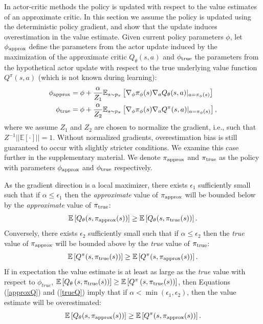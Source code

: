 \documentclass{article}
\newcommand{\e}{\epsilon}
\newcommand{\E}{\mathbb{E}}
\newcommand{\lb}{\left [}
\newcommand{\rb}{\right ]}
\newcommand{\lp}{\left (}
\newcommand{\rp}{\right )}
\begin{document}
In actor-critic methods the policy is updated with respect to the value estimates of an approximate critic. In this section we assume the policy is updated using the deterministic policy gradient, and show that the update induces overestimation in the value estimate. 
Given current policy parameters $\phi$, let $\phi_\textnormal{approx}$ define the parameters from the actor update induced by the maximization of the approximate critic $Q_\theta(s,a)$ and $\phi_\textnormal{true}$ the parameters from the hypothetical actor update with respect to the true underlying value function $Q^\pi(s,a)$ (which is not known during learning): 
\begin{equation}
\begin{aligned}
\phi_\textnormal{approx} &= \phi + \frac{\alpha}{Z_1} \E_{s \sim p_\pi} \lb \nabla_\phi \pi_\phi(s) \nabla_a Q_\theta(s,a)|_{a=\pi_\phi(s)} \rb\\
\phi_\textnormal{true} &= \phi + \frac{\alpha}{Z_2} \E_{s \sim p_\pi} \lb \nabla_\phi \pi_\phi(s) \nabla_a Q^\pi(s,a)|_{a=\pi_\phi(s)} \rb,
\end{aligned}
\end{equation} 
where we assume $Z_1$ and $Z_2$ are chosen to normalize the gradient, i.e., such that $Z^{-1}||\E[\cdot]|| = 1$. Without normalized gradients, overestimation bias is still guaranteed to occur with slightly stricter conditions. We examine this case further in the supplementary material. We denote $\pi_\textnormal{approx}$ and $\pi_\textnormal{true}$ as the policy with parameters $\phi_\textnormal{approx}$ and $\phi_\textnormal{true}$ respectively. 

As the gradient direction is a local maximizer, there exists $\e_1$ sufficiently small such that if $\alpha \leq \e_1$ then the \emph{approximate} value of $\pi_\textnormal{approx}$ will be bounded below by the \emph{approximate} value of $\pi_\textnormal{true}$:
\begin{equation} \label{approxQ}
\E \lb Q_\theta(s, \pi_\textnormal{approx}(s)) \rb 
\geq 
\E \lb Q_\theta(s, \pi_\textnormal{true}(s)) \rb.
\end{equation}
Conversely, there exists $\e_2$ sufficiently small such that if $\alpha \leq \e_2$ then the \emph{true} value of $\pi_\textnormal{approx}$ will be bounded above by the \emph{true} value of $\pi_\textnormal{true}$:
\begin{equation} \label{trueQ}
\E \lb Q^\pi(s, \pi_\textnormal{true}(s)) \rb
\geq 
\E \lb Q^\pi(s, \pi_\textnormal{approx}(s)) \rb.
\end{equation}
If in expectation the value estimate is at least as large as the \textit{true} value with respect to $\phi_{true}$, 
$\E \lb Q_\theta \lp s, \pi_\textnormal{true}(s) \rp \rb \geq \E \lb Q^\pi \lp s, \pi_\textnormal{true}(s) \rp \rb$, then Equations (\ref{approxQ}) and (\ref{trueQ}) imply that if $\alpha < \min(\e_1, \e_2)$, then the value estimate will be overestimated:
\begin{equation}
\label{overestimation}
\E \lb Q_\theta(s, \pi_\textnormal{approx}(s)) \rb
\geq 
\E \lb Q^\pi(s, \pi_\textnormal{approx}(s)) \rb. 
\end{equation}
\end{document}

